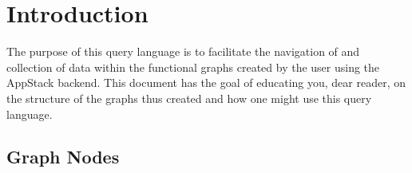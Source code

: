 %
%
%
%
%
%
%
%
\maketitle
\section{Introduction} %
\label{sec:introduction}
The purpose of this query language is to facilitate the navigation of and collection of data within the functional graphs created by the user using the AppStack backend. This document has the goal of educating you, dear reader, on the structure of the graphs thus created and how one might use this query language.

\subsection{Graph Nodes} %
\label{sub:graph_nodes}

